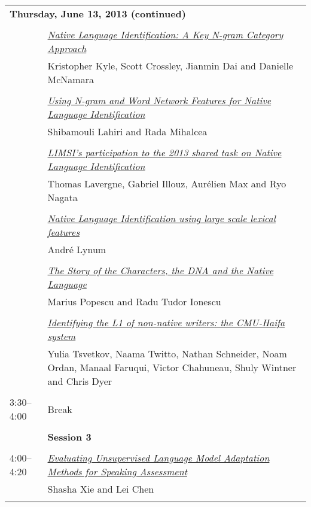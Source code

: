 \begin{tabular}{p{20mm}p{138mm}}
\\
\multicolumn{2}{l}{\bf Thursday, June 13, 2013
 (continued)} \\\\
 & \hyperlink{page.242}{\em Native Language Identification: A Key N-gram Category Approach}\\
         & Kristopher Kyle, Scott Crossley, Jianmin Dai and Danielle McNamara \\
\\

 & \hyperlink{page.251}{\em Using N-gram and Word Network Features for Native Language Identification}\\
         & Shibamouli Lahiri and Rada Mihalcea \\
\\

 & \hyperlink{page.260}{\em LIMSI’s participation to the 2013 shared task on Native Language Identification}\\
         & Thomas Lavergne, Gabriel Illouz, Aur\'{e}lien Max and Ryo Nagata \\
\\

 & \hyperlink{page.266}{\em Native Language Identification using large scale lexical features}\\
         & Andr\'{e} Lynum \\
\\

 & \hyperlink{page.270}{\em The Story of the Characters, the DNA and the Native Language}\\
         & Marius Popescu and Radu Tudor Ionescu \\
\\

 & \hyperlink{page.279}{\em Identifying the L1 of non-native writers: the CMU-Haifa system}\\
         & Yulia Tsvetkov, Naama Twitto, Nathan Schneider, Noam Ordan, Manaal Faruqui, Victor Chahuneau, Shuly Wintner and Chris Dyer \\
\\

3:30--4:00 & Break
 \\
\\
 & {\bf Session 3
} \\
\\
4:00--4:20 & \hyperlink{page.288}{\em Evaluating Unsupervised Language Model Adaptation Methods for Speaking Assessment}\\
         & Shasha Xie and Lei Chen \\
\\


\end{tabular}
